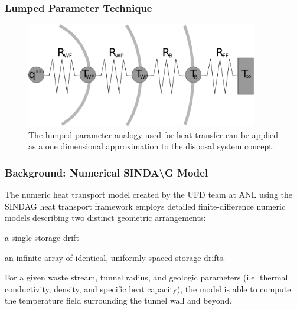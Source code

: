 \begin{frame}[ctb!]
  \frametitle{Lumped Parameter Technique}
  \begin{figure}[h!]
    \begin{center}
      \includegraphics[width=0.9\textwidth]{lumpedParam.eps}
    \end{center}
    \caption{The lumped parameter analogy used for heat transfer can be applied 
    as a one dimensional approximation to the disposal system concept. }
    \label{fig:lumpedParam}
  \end{figure}
\end{frame}



\begin{frame}[ctb!]
  \frametitle{Background: Numerical SINDA{\textbackslash}G Model}

  The numeric heat transport model created by the \gls{UFD} team at \gls{ANL} 
  using the \gls{SINDAG} heat transport framework employs detailed finite-difference numeric  
  models describing two distinct geometric arrangements: 

  \begin{enum}
  \item a single storage drift 
  \item an infinite array of identical, uniformly spaced  storage drifts.  
  \end{enum}
  
  For a given waste stream, tunnel radius, and geologic parameters (i.e. thermal conductivity, density, and 
  specific heat capacity), the model is able to compute the temperature field 
  surrounding the tunnel wall and beyond.  
\end{frame}

